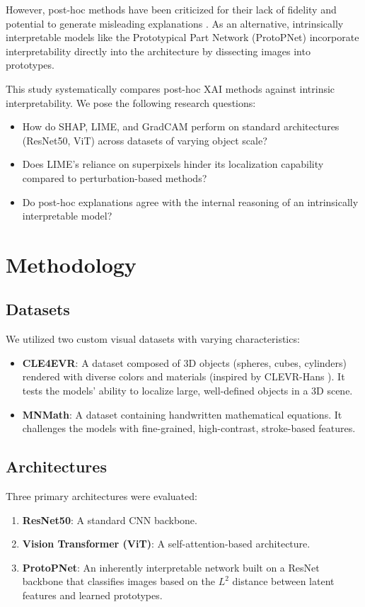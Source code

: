 \documentclass[conference]{IEEEtran}
\begin{document}
However, post-hoc methods have been criticized for their lack of fidelity and potential to generate misleading explanations \cite{adebayo2018sanity, yeh2019fidelity}. As an alternative, intrinsically interpretable models like the Prototypical Part Network (ProtoPNet) \cite{chen2019this} incorporate interpretability directly into the architecture by dissecting images into prototypes.

This study systematically compares post-hoc XAI methods against intrinsic interpretability. We pose the following research questions:
\begin{itemize}
    \item How do SHAP, LIME, and GradCAM perform on standard architectures (ResNet50, ViT) across datasets of varying object scale?
    \item Does LIME's reliance on superpixels hinder its localization capability compared to perturbation-based methods?
    \item Do post-hoc explanations agree with the internal reasoning of an intrinsically interpretable model?
\end{itemize}

\section{Methodology}

\subsection{Datasets}
We utilized two custom visual datasets with varying characteristics:
\begin{itemize}
    \item \textbf{CLE4EVR}: A dataset composed of 3D objects (spheres, cubes, cylinders) rendered with diverse colors and materials (inspired by CLEVR-Hans \cite{stammer2021right}). It tests the models' ability to localize large, well-defined objects in a 3D scene.
    \item \textbf{MNMath}: A dataset containing handwritten mathematical equations. It challenges the models with fine-grained, high-contrast, stroke-based features.
\end{itemize}

\subsection{Architectures}
Three primary architectures were evaluated:
\begin{enumerate}
    \item \textbf{ResNet50}: A standard CNN backbone.
    \item \textbf{Vision Transformer (ViT)}: A self-attention-based architecture.
    \item \textbf{ProtoPNet}: An inherently interpretable network built on a ResNet backbone that classifies images based on the $L^2$ distance between latent features and learned prototypes.
\end{enumerate}
\end{document}
